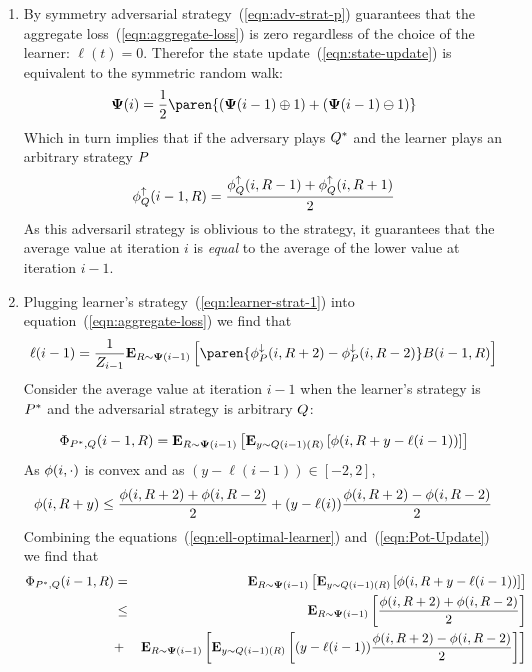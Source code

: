 \documentclass{article}[12pt]
\begin{document}
\proof
\begin{enumerate}
\item By symmetry adversarial strategy~(\ref{eqn:adv-strat-p}) guarantees that
  the aggregate loss~(\ref{eqn:aggregate-loss}) is zero regardless of
  the choice of the learner: $\ell(t)=0$.
  Therefor the state update~(\ref{eqn:state-update}) is equivalent to
  the symmetric random walk:
  $$\state(i) = \frac{1}{2} \paren{(\state(i-1) \oplus 1) + (\state(i-1)
    \ominus 1)}$$
  Which in turn implies that if the adversary plays $Q^*$
  and the learner plays an arbitrary strategy $P$
  \begin{equation} \label{eqn:lower}
    \phi_{Q}^{\uparrow}(i-1,R) = \frac{\phi_{Q}^{\uparrow}(i,R-1)+\phi_{Q}^{\uparrow}(i,R+1)}{2}
  \end{equation}
  As this adversaril strategy is oblivious to the strategy, it
  guarantees that the average value at iteration $i$ is {\em equal} to the
  average of the lower value at iteration $i-1$.
\item
 Plugging learner's strategy~(\ref{eqn:learner-strat-1}) into equation~(\ref{eqn:aggregate-loss}) we find that
 \begin{equation} \label{eqn:ell-optimal-learner}
   \ell(i-1) = \frac{1}{Z_{i-1}} \E{\R \sim \state(i-1)}{\paren{\upperpot(i,\R+2)-\upperpot(i,\R-2)}
   \Bias(i-1,\R)}
\end{equation}
  Consider the average value at iteration $i-1$ when the learner's strategy
  is $P^*$ and the adversarial strategy is arbitrary $Q$:
  
   \begin{equation} \label{eqn:Pot-Update}
    \Phi_{P^*,Q}(i-1,R) = {\bf E}_{R \sim {\bf \Psi}(i-1)}\left[  {\bf E}_{y \sim
      Q(i-1)(R)}\left[ \phi(i,R+y-\ell(i-1)) \right] \right]
  \end{equation}
  As $\phi(i,\cdot)$ is convex and as $(y-\ell(i-1)) \in [-2,2]$,
  \begin{equation} \label{eqn:pot-upper}
    \phi(i,R+y) \leq \frac{\phi(i,R+2)+\phi(i,R-2)}{2} +
    (y-\ell(i)) \frac{\phi(i,R+2)-\phi(i,R-2)}{2}
    \end{equation}
  Combining the equations~(\ref{eqn:ell-optimal-learner}) and~(\ref{eqn:Pot-Update}) we find that
  \begin{eqnarray}
  \Phi_{P^*,Q}(i-1,R)&=&{\bf E}_{R \sim {\bf \Psi}(i-1)}\left[ {\bf E}_{y \sim Q(i-1)(R)}\left[ \phi(i,R+y-\ell(i-1)) \right] \right]\\
  &\leq & {\bf E}_{R \sim {\bf \Psi}(i-1)}\left[ \frac{\phi(i,R+2)+\phi(i,R-2)}{2} \right]\\
  &+&
  {\bf E}_{R \sim {\bf \Psi}(i-1)}\left[ {\bf E}_{y \sim Q(i-1)(R)}\left[ (y-\ell(i-1)) \frac{\phi(i,R+2)-\phi(i,R-2)}{2} \right] \right] \label{eqn:zero-term}
  \end{eqnarray}
  

\end{enumerate}
\end{document}
